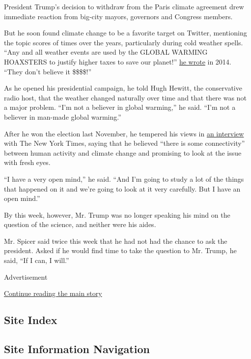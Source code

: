 President Trump's decision to withdraw from the Paris climate agreement
drew immediate reaction from big-city mayors, governors and Congress
members.

But he soon found climate change to be a favorite target on Twitter,
mentioning the topic scores of times over the years, particularly during
cold weather spells. ``Any and all weather events are used by the GLOBAL
WARMING HOAXSTERS to justify higher taxes to save our planet!''
\href{https://twitter.com/realDonaldTrump/status/427556692109574146?ref_src=twsrc\%5Etfw\&ref_url=http\%3A\%2F\%2Fwww.motherjones.com\%2Fenvironment\%2F2016\%2F11\%2Ftrump-climate-timeline}{he
wrote} in 2014. ``They don't believe it \$\$\$\$!''

As he opened his presidential campaign, he told Hugh Hewitt, the
conservative radio host, that the weather changed naturally over time
and that there was not a major problem. ``I'm not a believer in global
warming,'' he said. ``I'm not a believer in man-made global warming.''

After he won the election last November, he tempered his views in
\href{https://www.nytimes3xbfgragh.onion/2016/11/23/us/politics/trump-new-york-times-interview-transcript.html}{an
interview} with The New York Times, saying that he believed ``there is
some connectivity'' between human activity and climate change and
promising to look at the issue with fresh eyes.

``I have a very open mind,'' he said. ``And I'm going to study a lot of
the things that happened on it and we're going to look at it very
carefully. But I have an open mind.''

By this week, however, Mr. Trump was no longer speaking his mind on the
question of the science, and neither were his aides.

Mr. Spicer said twice this week that he had not had the chance to ask
the president. Asked if he would find time to take the question to Mr.
Trump, he said, ``If I can, I will.''

Advertisement

\protect\hyperlink{after-bottom}{Continue reading the main story}

\hypertarget{site-index}{%
\subsection{Site Index}\label{site-index}}

\hypertarget{site-information-navigation}{%
\subsection{Site Information
Navigation}\label{site-information-navigation}}

